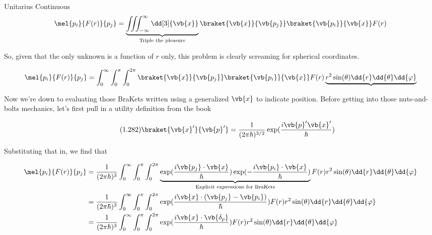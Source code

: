 \begin{answer}
\begin{answerpart}{Unitarius Continuous}
    \begin{equation}
      \begin{alignedat}{2}
        &&\mel{p_i}{F(r)}{p_j}
        &= \underbrace{\iiint_{-\infty}^{\infty} \dd[3]{\vb{x}}}_{\text{Triple the pleasure}}
        \braket{\vb{x}}{\vb{p_j}}\braket{\vb{p_i}}{\vb{x}}F(r)
        \\
      \end{alignedat}
    \end{equation}

    So, given that the only unknown is a function of $r$ only, this
    problem is clearly screaming for spherical coordinates.
    
    \begin{equation}
      \begin{alignedat}{2}
        &&\mel{p_i}{F(r)}{p_j}
        &= \int_{0}^{\infty} \int_{0}^{\pi} \int_{0}^{2\pi}
        \braket{\vb{x}}{\vb{p_j}}\braket{\vb{p_i}}{\vb{x}}F(r)
        \underbrace{r^2 \sin(\theta) \dd{r}\dd{\theta}\dd{\varphi}}
        \\
      \end{alignedat}
    \end{equation}

    Now we're down to evaluating those BraKets written using a
    generalized $\vb{x}$ to indicate position.  Before getting into
    those nuts-and-bolts mechanics, let's first pull in a utility
    definition from the book

    \begin{equation}
      \tag{1.282}
      \braket{\vb{x}'}{\vb{p}'} = \frac{1}{(2\pi\hbar)^{3/2}} \exp(\frac{i\vb{p}'\vb{x}'}{\hbar})
    \end{equation}

    Substituting that in, we find that
    
    \begin{equation}
      \begin{alignedat}{2}
        &&\mel{p_i}{F(r)}{p_j}
        &=
        \frac{1}{(2\pi\hbar)^3}
        \int_{0}^{\infty} \int_{0}^{\pi} \int_{0}^{2\pi}
        \underbrace{
          \exp(\frac{i\vb{p_j}\cdot\vb{x}}{\hbar})
          \exp(-\frac{i\vb{p_i}\cdot\vb{x}}{\hbar})}_{
          \text{Explicit expressions for BraKets}}
        F(r)
        r^2 \sin(\theta) \dd{r}\dd{\theta}\dd{\varphi}
        \\
        &&&= \frac{1}{(2\pi\hbar)^3}\int_{0}^{\infty} \int_{0}^{\pi} \int_{0}^{2\pi}
        \exp(\frac{i\vb{x}\cdot(\vb{p_j}-\vb{p_i})}{\hbar})
        F(r)
        r^2 \sin(\theta) \dd{r}\dd{\theta}\dd{\varphi}
        \\
        &&&= \frac{1}{(2\pi\hbar)^3}\int_{0}^{\infty} \int_{0}^{\pi} \int_{0}^{2\pi}
        \exp(\frac{i\vb{x}\cdot\vb{\delta_p}}{\hbar})
        F(r)
        r^2 \sin(\theta) \dd{r}\dd{\theta}\dd{\varphi}
        \\
      \end{alignedat}
    \end{equation}


\end{answerpart}
\end{answer}
